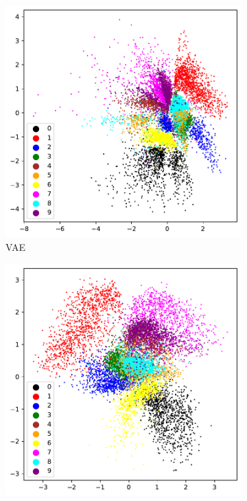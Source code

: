 \begin{figure}[!h]
	\begin{subfigure}[t]{0.49\textwidth}
		\centering
		\includegraphics[width = 1\textwidth]{figures/vae/clustering}
		\caption{VAE}
	\end{subfigure}
	\begin{subfigure}[t]{0.49\textwidth}
		\centering
		\includegraphics[width = 1\textwidth]{figures/cvae/clustering}

\end{subfigure}
\end{figure}
